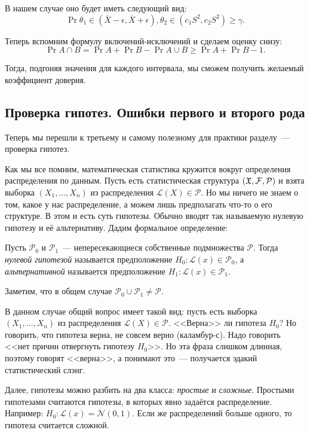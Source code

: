 В нашем случае оно будет иметь следующий вид:
\[
    \Pr{\theta_{1} \in (\overline{X} - \epsilon, \overline{X} + \epsilon), \theta_{2} \in 
    (c_{1}S^{2}, c_{2}S^{2})} \geq \gamma.
\]

Теперь вспомним формулу включений-исключений и сделаем оценку снизу:
\[
    \Pr{A \cap B} = \Pr{A} + \Pr{B} - \Pr{A \cup B} \geq \Pr{A} + \Pr{B} - 1.
\]

Тогда, подгоняя значения для каждого интервала, мы сможем получить желаемый коэффициент 
доверия.

\subsection{Проверка гипотез. Ошибки первого и второго рода}
Теперь мы перешли к третьему и самому полезному для практики разделу~--- проверка 
гипотез. 

Как мы все помним, математическая статистика кружится вокруг определения распределения по 
данным. Пусть есть статистическая структура \((\mathfrak{X}, \mathcal{F}, \mathcal{P})\) и взята выборка 
\((X_{1}, \dots, X_{n})\) из распределения \(\mathcal{L}(X) \in \mathcal{P}\). Но мы 
ничего не знаем о том, какое у нас распределение, а можем лишь предполагать что-то о его 
структуре. В этом и есть суть гипотезы. Обычно вводят так называемую нулевую гипотезу и 
её альтернативу. Дадим формальное определение:
\begin{definition}
    Пусть \(\mathcal{P}_{0}\) и \(\mathcal{P}_{1}\)~--- непересекающиеся собственные 
    подмножества \(\mathcal{P}\). Тогда \emph{нулевой гипотезой} называется предположение 
    \(H_{0} : \mathcal{L}(x) \in \mathcal{P}_{0}\), а \emph{альтернативной} называется 
    предположение \(H_{1} : \mathcal{L}(x) \in \mathcal{P}_{1}\).
\end{definition}
Заметим, что в общем случае \(\mathcal{P}_{0} \cup \mathcal{P}_{1} \neq \mathcal{P}\).

В данном случае общий вопрос имеет такой вид: пусть есть выборка 
\((X_{1}, \dots, X_{n})\) из распределения \(\mathcal{L}(X) \in \mathcal{P}\). <<Верна>> 
ли гипотеза \(H_{0}\)? Но говорить, что гипотеза верна, не совсем верно (каламбур-с). 
Надо говорить <<нет причин отвергнуть гипотезу \(H_{0}\)>>. Но эта фраза слишком длинная, 
поэтому говорят <<верна>>, а понимают это~--- получается эдакий статистический слэнг.

Далее, гипотезы можно разбить на два класса: \emph{простые} и \emph{сложные}. Простыми 
гипотезами считаются гипотезы, в которых явно задаётся распределение. Например: \(H_{0} : 
\mathcal{L}(x) = \mathcal{N}(0, 1)\). Если же распределений больше одного, то гипотеза 
считается сложной.

